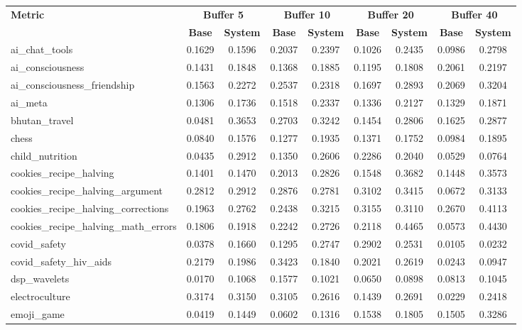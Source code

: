 \documentclass[pdflatex,sn-mathphys-num]{sn-jnl}%
\theoremstyle{thmstyleone}%
\theoremstyle{thmstyletwo}%
\theoremstyle{thmstylethree}%
\begin{document}
\begin{appendices}
\begin{landscape}
\begin{longtable}{@{}p{3.8cm}cccccccc@{}}
\toprule
\textbf{Metric} & \multicolumn{2}{c}{\textbf{Buffer 5}} & \multicolumn{2}{c}{\textbf{Buffer 10}} & \multicolumn{2}{c}{\textbf{Buffer 20}} & \multicolumn{2}{c}{\textbf{Buffer 40}} \\
\cmidrule(lr){2-3}\cmidrule(lr){4-5}\cmidrule(lr){6-7}\cmidrule(lr){8-9}
 & \textbf{Base} & \textbf{System} & \textbf{Base} & \textbf{System} & \textbf{Base} & \textbf{System} & \textbf{Base} & \textbf{System} \\
\midrule
\endhead
ai\_chat\_tools & 0.1629 & 0.1596 & 0.2037 & 0.2397 & 0.1026 & 0.2435 & 0.0986 & 0.2798 \\
ai\_consciousness & 0.1431 & 0.1848 & 0.1368 & 0.1885 & 0.1195 & 0.1808 & 0.2061 & 0.2197 \\
ai\_consciousness\_friendship & 0.1563 & 0.2272 & 0.2537 & 0.2318 & 0.1697 & 0.2893 & 0.2069 & 0.3204 \\
ai\_meta & 0.1306 & 0.1736 & 0.1518 & 0.2337 & 0.1336 & 0.2127 & 0.1329 & 0.1871 \\
bhutan\_travel & 0.0481 & 0.3653 & 0.2703 & 0.3242 & 0.1454 & 0.2806 & 0.1625 & 0.2877 \\
chess & 0.0840 & 0.1576 & 0.1277 & 0.1935 & 0.1371 & 0.1752 & 0.0984 & 0.1895 \\
child\_nutrition & 0.0435 & 0.2912 & 0.1350 & 0.2606 & 0.2286 & 0.2040 & 0.0529 & 0.0764 \\
cookies\_recipe\_halving & 0.1401 & 0.1470 & 0.2013 & 0.2826 & 0.1548 & 0.3682 & 0.1448 & 0.3573 \\
cookies\_recipe\_halving\_argument & 0.2812 & 0.2912 & 0.2876 & 0.2781 & 0.3102 & 0.3415 & 0.0672 & 0.3133 \\
cookies\_recipe\_halving\_corrections & 0.1963 & 0.2762 & 0.2438 & 0.3215 & 0.3155 & 0.3110 & 0.2670 & 0.4113 \\
cookies\_recipe\_halving\_math\_errors & 0.1806 & 0.1918 & 0.2242 & 0.2726 & 0.2118 & 0.4465 & 0.0573 & 0.4430 \\
covid\_safety & 0.0378 & 0.1660 & 0.1295 & 0.2747 & 0.2902 & 0.2531 & 0.0105 & 0.0232 \\
covid\_safety\_hiv\_aids & 0.2179 & 0.1986 & 0.3423 & 0.1840 & 0.2021 & 0.2619 & 0.0243 & 0.0947 \\
dsp\_wavelets & 0.0170 & 0.1068 & 0.1577 & 0.1021 & 0.0650 & 0.0898 & 0.0813 & 0.1045 \\
electroculture & 0.3174 & 0.3150 & 0.3105 & 0.2616 & 0.1439 & 0.2691 & 0.0229 & 0.2418 \\
emoji\_game & 0.0419 & 0.1449 & 0.0602 & 0.1316 & 0.1538 & 0.1805 & 0.1505 & 0.3286 \\

\end{longtable}
\end{landscape}
\end{appendices}
\end{document}
